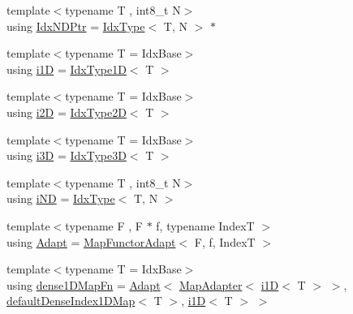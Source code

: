 \begin{DoxyCompactItemize}
\item 
{\footnotesize template$<$typename T , int8\+\_\+t N$>$ }\\using \hyperlink{namespacevt_1_1mapping_ab77f5302cd346d499e48a8c796043746}{Idx\+N\+D\+Ptr} = \hyperlink{namespacevt_a906c25b521ff516f5e8ba6d96fe2d424}{Idx\+Type}$<$ T, N $>$ $\ast$
\item 
{\footnotesize template$<$typename T  = Idx\+Base$>$ }\\using \hyperlink{namespacevt_1_1mapping_af0c14a9a77e0311b3d089143ed93ba76}{i1D} = \hyperlink{namespacevt_a36127c6500f2311908c959be653da40e}{Idx\+Type1D}$<$ T $>$
\item 
{\footnotesize template$<$typename T  = Idx\+Base$>$ }\\using \hyperlink{namespacevt_1_1mapping_a6448c875e0807b43f31e96fc5b0cec04}{i2D} = \hyperlink{namespacevt_ab0fbc5ddf69b5aa0ed6a8d1658b504eb}{Idx\+Type2D}$<$ T $>$
\item 
{\footnotesize template$<$typename T  = Idx\+Base$>$ }\\using \hyperlink{namespacevt_1_1mapping_af435b967b9ed1ccb5ec4effdbd9abd13}{i3D} = \hyperlink{namespacevt_a65e4a83c0567ecb7a54b78e9b8e7d7ab}{Idx\+Type3D}$<$ T $>$
\item 
{\footnotesize template$<$typename T , int8\+\_\+t N$>$ }\\using \hyperlink{namespacevt_1_1mapping_ad53b53dc14e67437c17cefe9c3c70380}{i\+ND} = \hyperlink{namespacevt_a906c25b521ff516f5e8ba6d96fe2d424}{Idx\+Type}$<$ T, N $>$
\item 
{\footnotesize template$<$typename F , F $\ast$ f, typename IndexT $>$ }\\using \hyperlink{namespacevt_1_1mapping_aafe187035ce8df02f31983e37cdb6a5d}{Adapt} = \hyperlink{namespacevt_1_1mapping_add4b5257a62b56d194f7e931b608f8f0}{Map\+Functor\+Adapt}$<$ F, f, IndexT $>$
\item 
{\footnotesize template$<$typename T  = Idx\+Base$>$ }\\using \hyperlink{namespacevt_1_1mapping_afe31b6db2c26ee24a6dd3cdf7b68415f}{dense1\+D\+Map\+Fn} = \hyperlink{namespacevt_1_1mapping_aafe187035ce8df02f31983e37cdb6a5d}{Adapt}$<$ \hyperlink{namespacevt_1_1mapping_a41b113c28bb6430fbcb5be66e08ccf9f}{Map\+Adapter}$<$ \hyperlink{namespacevt_1_1mapping_af0c14a9a77e0311b3d089143ed93ba76}{i1D}$<$ T $>$ $>$, \hyperlink{namespacevt_1_1mapping_ae055a42b89a59fd6d0cc6d40f9abf3b5}{default\+Dense\+Index1\+D\+Map}$<$ T $>$, \hyperlink{namespacevt_1_1mapping_af0c14a9a77e0311b3d089143ed93ba76}{i1D}$<$ T $>$ $>$
\item 

\end{DoxyCompactItemize}
